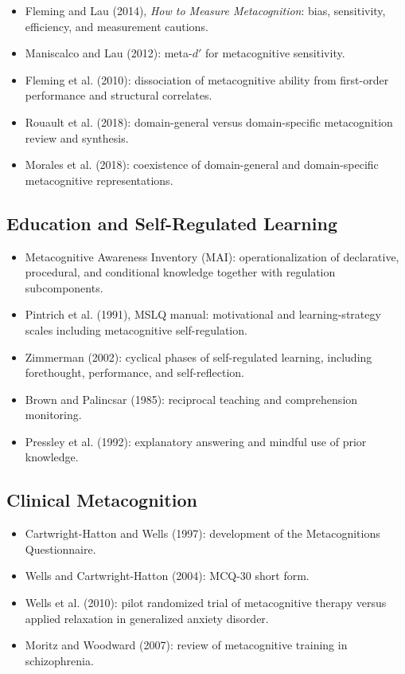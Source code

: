 \documentclass[a4paper]{article}
\begin{document}
   \begin{itemize}
      \item Fleming and Lau (2014), \emph{How to Measure Metacognition}: bias, sensitivity, efficiency, and measurement cautions.
      \item Maniscalco and Lau (2012): meta-$d'$ for metacognitive sensitivity.
      \item Fleming et al. (2010): dissociation of metacognitive ability from first-order performance and structural correlates.
      \item Rouault et al. (2018): domain-general versus domain-specific metacognition review and synthesis.
      \item Morales et al. (2018): coexistence of domain-general and domain-specific metacognitive representations.
   \end{itemize}

   \subsection{Education and Self-Regulated Learning}

   \begin{itemize}
      \item Metacognitive Awareness Inventory (MAI): operationalization of declarative, procedural, and conditional knowledge together with regulation subcomponents.
      \item Pintrich et al. (1991), MSLQ manual: motivational and learning-strategy scales including metacognitive self-regulation.
      \item Zimmerman (2002): cyclical phases of self-regulated learning, including forethought, performance, and self-reflection.
      \item Brown and Palincsar (1985): reciprocal teaching and comprehension monitoring.
      \item Pressley et al. (1992): explanatory answering and mindful use of prior knowledge.
   \end{itemize}

   \subsection{Clinical Metacognition}

   \begin{itemize}
      \item Cartwright-Hatton and Wells (1997): development of the Metacognitions Questionnaire.
      \item Wells and Cartwright-Hatton (2004): MCQ-30 short form.
      \item Wells et al. (2010): pilot randomized trial of metacognitive therapy versus applied relaxation in generalized anxiety disorder.
      \item Moritz and Woodward (2007): review of metacognitive training in schizophrenia.
   \end{itemize}
\end{document}

